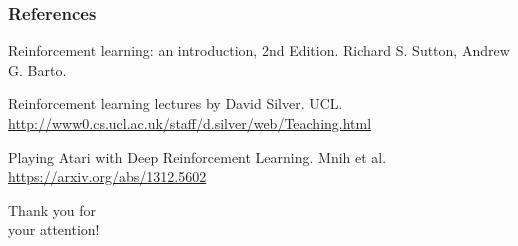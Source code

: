 \documentclass{beamer}
\begin{document}
\begin{frame}
\frametitle{References}
\footnotesize{
\begin{thebibliography}{5} 
	
\label{rl_book}
Reinforcement learning: an introduction, 2nd Edition. 
Richard S. Sutton, Andrew G. Barto. 

\label{ucl_course}
Reinforcement learning lectures by David Silver. UCL.
\url{http://www0.cs.ucl.ac.uk/staff/d.silver/web/Teaching.html} 

\label{deepmind}
Playing Atari with Deep Reinforcement Learning. Mnih et al.
\url{https://arxiv.org/abs/1312.5602}


\end{thebibliography}
}
\end{frame}


\begin{frame}

\begin{center}
	\Huge Thank you for 
	\\
	your attention!
\end{center}

\end{frame}

\end{document}
